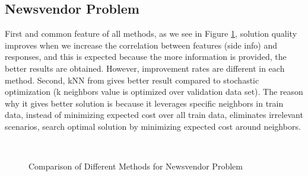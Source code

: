\documentclass[12pt]{article}
\begin{document}
\subsection{Newsvendor Problem}
First and common feature of all methods, as we see in Figure \ref{plot:graph3}, solution quality improves when we increase the correlation between features (side info) and responses, and this is expected because the more information is provided, the better results are obtained. However, improvement rates are different in each method. Second, kNN from \cite{doi:10.1287/mnsc.2018.3253} gives better result compared to stochastic optimization (k neighbors value is optimized over validation data set). The reason why it gives better solution is because it leverages specific neighbors in train data, instead of minimizing expected cost over all train data, eliminates irrelevant scenarios, search optimal solution by minimizing expected cost around neighbors.
\begin{figure}
\\
\caption{Comparison of Different Methods for Newsvendor Problem}
\label{plot:graph3}
\end{figure}
\end{document}
